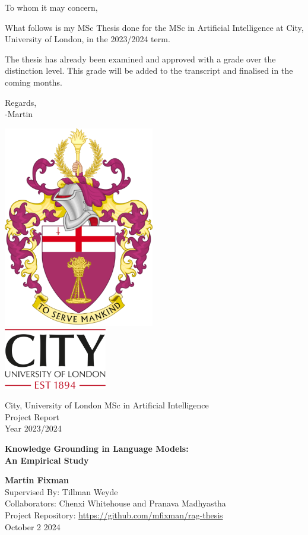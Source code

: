 \documentclass[a4paper,11pt]{article}
\begin{document}
\thispagestyle{empty}
To whom it may concern,

What follows is my MSc Thesis done for the MSc in Artificial Intelligence at City, University of London, in the 2023/2024 term.

The thesis has already been examined and approved with a grade over the distinction level.
This grade will be added to the transcript and finalised in the coming months.

Regards, \\
-Martin

\begin{titlepage}
	\centering
	\Large
	\sffamily

	\includegraphics[height=250pt]{to_serve_mankind.png} \\[1ex]
	\includegraphics[height=75pt]{City.png}

	City, University of London MSc in Artificial Intelligence \\
	Project Report \\
	Year 2023/2024

	\vfill{}

	\begin{huge}
		\bfseries
		Knowledge Grounding in Language Models: \\[1ex]
		An Empirical Study
	\end{huge}

	\vfill{}

	\textbf{Martin Fixman} \\
	Supervised By: Tillman Weyde \\
	Collaborators: Chenxi Whitehouse and Pranava Madhyastha \\[1em]
	Project Repository: \url{https://github.com/mfixman/rag-thesis} \\[1em]
	October 2 2024
\end{titlepage}
\end{document}
